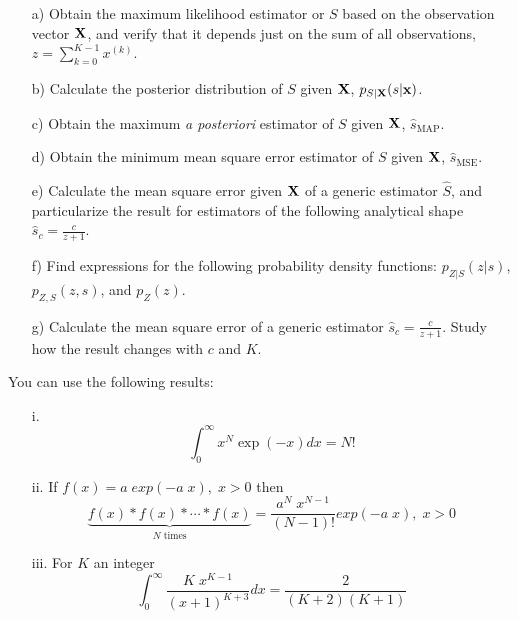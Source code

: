 \begin{itemize}
    \item[a)] Obtain the maximum likelihood estimator or $S$ based on the observation vector $\bf X$, and verify that it depends just on the sum of all observations, $z=\sum_{k=0}^{K-1} x^{(k)}$.
    
    \item[b)] Calculate the posterior distribution of $S$ given $\bf X$, $p_{S|{\bf X}}(s|{\bf x})$.
    
    \item[c)] Obtain the maximum {\em a posteriori} estimator of $S$ given $\bf X$, ${\hat s}_\text{MAP}$.
    
    \item[d)] Obtain the minimum mean square error estimator of $S$ given $\bf X$, ${\hat s}_\text{MSE}$.
    
    \item[e)] Calculate the mean square error given ${\bf X}$ of a generic estimator $\hat S$, and particularize the result for estimators of the following analytical shape $\hat{s}_c = \frac{c}{z+1}$.

    \item[f)] Find expressions for the following probability density functions: $p_{Z|S}(z|s)$, $p_{Z,S}(z,s)$, and $p_{Z}(z)$.
    
    \item[g)] Calculate the mean square error of a generic estimator $\hat{s}_c = \frac{c}{z+1}$. Study how the result changes with $c$ and $K$.
    
    
\end{itemize}

You can use the following results:
\begin{itemize}
    \item[i.] $$\int_{0}^{\infty} x^N \exp(-x) dx = N!$$
    \item[ii.] If $f(x) = a\;exp(-a\;x), \;x>0$ then 
    $$\underbrace{f(x)\ast f(x) \ast \cdots \ast f(x)}_\text{$N$ times} = \displaystyle\frac{a^N \; x^{N-1}}{(N-1)!} exp(-a\;x), \; x>0$$
    \item[iii.] For $K$ an integer
    $$\int_0^\infty \frac{K\;x^{K-1}}{(x+1)^{K+3}} dx = \displaystyle\frac{2}{(K+2)(K+1)}  $$
\end{itemize} 

